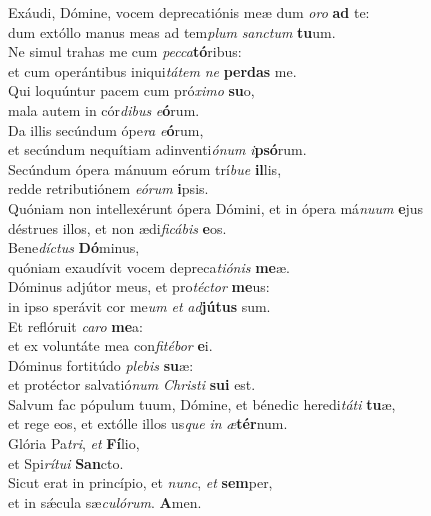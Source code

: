 \evenverse Exáudi, Dómine, vocem deprecatiónis meæ dum \textit{o}\textit{ro} \textbf{ad} te:~\*\\
\evenverse dum extóllo manus meas ad tem\textit{plum} \textit{san}\textit{ctum} \textbf{tu}um.\\
\oddverse Ne simul trahas me cum \textit{pec}\textit{ca}\textbf{tó}ribus:~\*\\
\oddverse et cum operántibus iniqui\textit{tá}\textit{tem} \textit{ne} \textbf{per}\textbf{das} me.\\
\evenverse Qui loquúntur pacem cum pró\textit{xi}\textit{mo} \textbf{su}o,~\*\\
\evenverse mala autem in cór\textit{di}\textit{bus} \textit{e}\textbf{ó}rum.\\
\oddverse Da illis secúndum ópe\textit{ra} \textit{e}\textbf{ó}rum,~\*\\
\oddverse et secúndum nequítiam adinventi\textit{ó}\textit{num} \textit{i}\textbf{psó}rum.\\
\evenverse Secúndum ópera mánuum eórum trí\textit{bu}\textit{e} \textbf{il}lis,~\*\\
\evenverse redde retributiónem \textit{e}\textit{ó}\textit{rum} \textbf{i}psis.\\
\oddverse Quóniam non intellexérunt ópera Dómini, et in ópera má\textit{nu}\textit{um} \textbf{e}jus~\*\\
\oddverse déstrues illos, et non ædi\textit{fi}\textit{cá}\textit{bis} \textbf{e}os.\\
\evenverse Bene\textit{dí}\textit{ctus} \textbf{Dó}minus,~\*\\
\evenverse quóniam exaudívit vocem depreca\textit{ti}\textit{ó}\textit{nis} \textbf{me}æ.\\
\oddverse Dóminus adjútor meus, et pro\textit{té}\textit{ctor} \textbf{me}us:~\*\\
\oddverse in ipso sperávit cor me\textit{um} \textit{et} \textit{ad}\textbf{jú}\textbf{tus} sum.\\
\evenverse Et reflóruit \textit{ca}\textit{ro} \textbf{me}a:~\*\\
\evenverse et ex voluntáte mea con\textit{fi}\textit{té}\textit{bor} \textbf{e}i.\\
\oddverse Dóminus fortitúdo \textit{ple}\textit{bis} \textbf{su}æ:~\*\\
\oddverse et protéctor salvatió\textit{num} \textit{Chri}\textit{sti} \textbf{su}\textbf{i} est.\\
\evenverse Salvum fac pópulum tuum, Dómine, et bénedic heredi\textit{tá}\textit{ti} \textbf{tu}æ,~\*\\
\evenverse et rege eos, et extólle illos us\textit{que} \textit{in} \textit{æ}\textbf{tér}num.\\
\oddverse Glória Pa\textit{tri}, \textit{et} \textbf{Fí}lio,~\*\\
\oddverse et Spi\textit{rí}\textit{tu}\textit{i} \textbf{San}cto.\\
\evenverse Sicut erat in princípio, et \textit{nunc}, \textit{et} \textbf{sem}per,~\*\\
\evenverse et in sǽcula sæ\textit{cu}\textit{ló}\textit{rum}. \textbf{A}men.\\

